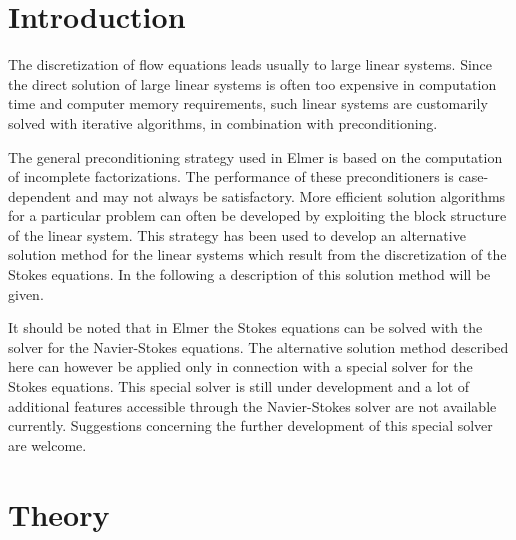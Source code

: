 \noindent
{}
\begin{versiona}

\section{Introduction}

The discretization of flow equations leads usually to large linear systems. Since
the direct solution of large linear systems is often too expensive in computation time 
and computer memory requirements, such linear systems are customarily solved
with iterative algorithms, in combination with preconditioning.

The general preconditioning strategy used in Elmer is based on the computation of 
incomplete factorizations. The performance of these preconditioners 
is case-dependent and may
not always be satisfactory. More efficient solution algorithms for a particular
problem can often be developed by exploiting the block structure of the 
linear system. This strategy has been used to develop an alternative
solution method for the linear systems which result from the discretization
of the Stokes equations. In the following a description of this solution 
method will be given.

It should be noted that in Elmer the Stokes equations can be solved with the solver 
for the Navier-Stokes equations. The alternative
solution method described here can however be applied only in connection with 
a special solver for the Stokes equations. This special solver is still
under development and a lot of additional features accessible through 
the Navier-Stokes solver are not available currently.       
Suggestions concerning the further development of this special solver are welcome.   


\section{Theory}


\end{versiona}
